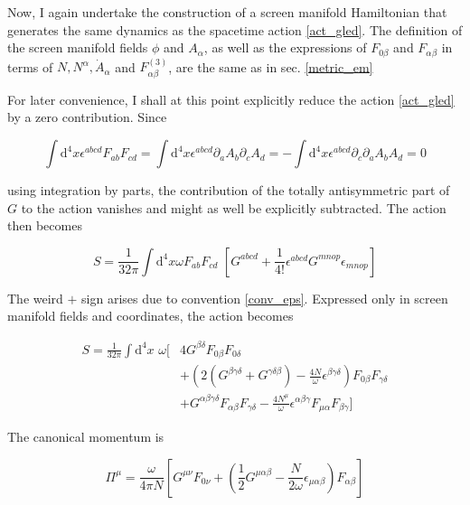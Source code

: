 \documentclass[11pt]{article}
\begin{document}
Now, I again undertake the construction of a screen manifold Hamiltonian that generates the same dynamics as the spacetime action \ref{act_gled}. The definition of the screen manifold fields $\phi$ and $A_\alpha$, as well as the expressions of $F_{ 0 \beta}$ and $F_{\alpha \beta}$ in terms of $N, N^\alpha, \dot{A}_\alpha$ and $F^{(3)}_{\alpha \beta}$, are the same as in sec. \ref{metric_em}

For later convenience, I shall at this point explicitly reduce the action \ref{act_gled} by a zero contribution. Since

\begin{equation}
	\int \mathrm{d}^4 x \epsilon^{a b c d} F_{a b} F_{c d} 
	= \int \mathrm{d}^4 x \epsilon^{a b c d} \partial_a A_b \partial_c A_d
	= - \int \mathrm{d}^4 x \epsilon^{a b c d} \partial_c \partial_a A_b A_d
	= 0
\end{equation}

using integration by parts, the contribution of the totally antisymmetric part of $G$ to the action vanishes and might as well be explicitly subtracted. The action then becomes

\begin{equation} 
	S = \frac{1}{32 \pi} \int \mathrm{d}^4 x \omega F_{a b} F_{c d} \, \,
	\left[ G^{a b c d} + \frac{1}{4!} \epsilon^{a b c d} G^{m n o p} \epsilon_{m n o p}
	\right]
\end{equation}

The weird $+$ sign arises due to convention \ref{conv_eps}. Expressed only in screen manifold fields and coordinates, the action becomes

\begin{equation} 
\begin{split}
	S = \frac{1}{32 \pi} \int \mathrm{d}^4 x \,\,\omega 
	[ 
	&4 G^{\beta \delta} F_{0 \beta} F_{0 \delta} \\
	&+ \left( 
	2 \left( G^{\beta \gamma \delta} + G^{ \gamma \delta \beta} \right)
	- \frac{4 N}{\omega} \epsilon^{\beta \gamma \delta}
	\right) F_{0 \beta} F_{\gamma \delta}\\
	&+ G^{\alpha \beta \gamma \delta} F_{\alpha \beta} F_{\gamma \delta}
	-  \frac{4 N^\mu}{\omega} 
	\epsilon^{\alpha \beta \gamma} F_{\mu \alpha} F_{\beta \gamma}
	]
\end{split}
\end{equation}

The canonical momentum is

\begin{equation}
	\Pi^\mu = \frac{\omega}{4 \pi N} 
	\left[ G^{\mu \nu} F_{0 \nu}
	+ \left( \frac{1}{2} G^{ \mu \alpha \beta} 
	- \frac{N}{2 \omega} \epsilon_{ \mu \alpha \beta}
	\right)
	F_{\alpha \beta}
	\right]
\end{equation}
\end{document}
